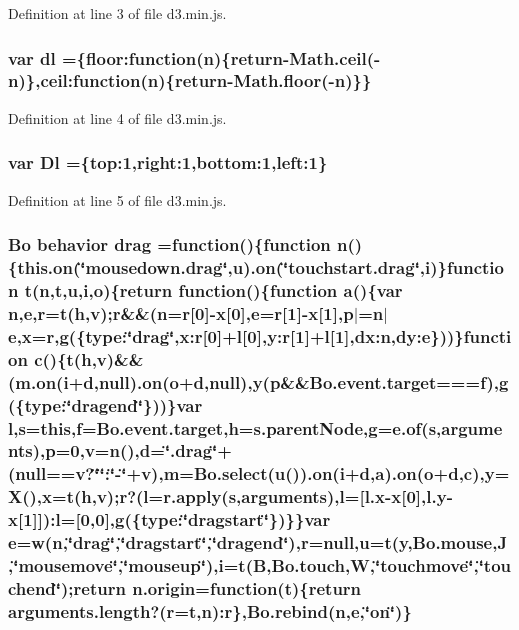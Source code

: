 Definition at line 3 of file d3.\+min.\+js.

\subsubsection[{dl}]{\setlength{\rightskip}{0pt plus 5cm}var dl =\{floor\+:function({\bf n})\{{\bf return}-\/Math.\+ceil(-\/{\bf n})\},ceil\+:function({\bf n})\{{\bf return}-\/Math.\+floor(-\/{\bf n})\}\}}\label{d3_8min_8js_a8789cc2be769165de1796cbaa31277bf}


Definition at line 4 of file d3.\+min.\+js.

\subsubsection[{Dl}]{\setlength{\rightskip}{0pt plus 5cm}var Dl =\{top\+:1,right\+:1,bottom\+:1,left\+:1\}}\label{d3_8min_8js_aed2ea4ac99f601276130fff5ecff77eb}


Definition at line 5 of file d3.\+min.\+js.

\subsubsection[{drag}]{ {\bf Bo} {\bf behavior} drag =function()\{function {\bf n}()\{{\bf this.\+on}(\char`\"{}mousedown.\+drag\char`\"{},u).{\bf on}(\char`\"{}touchstart.\+drag\char`\"{},i)\}function t({\bf n},t,u,{\bf i},{\bf o})\{{\bf return} function()\{function {\bf a}()\{var {\bf n},{\bf e},{\bf r}=t(h,v);{\bf r}\&\&({\bf n}={\bf r}[0]-\/{\bf x}[0],{\bf e}={\bf r}[1]-\/{\bf x}[1],p$\vert$={\bf n}$\vert${\bf e},{\bf x}={\bf r},g(\{type\+:\char`\"{}drag\char`\"{},x\+:r[0]+l[0],y\+:r[1]+l[1],dx\+:n,dy\+:e\}))\}function {\bf c}()\{t(h,v)\&\&({\bf m.\+on}({\bf i}+{\bf d},null).{\bf on}({\bf o}+{\bf d},null),y(p\&\&Bo.\+event.\+target==={\bf f}),g(\{type\+:\char`\"{}dragend\char`\"{}\}))\}var l,s={\bf this},{\bf f}=Bo.\+event.\+target,h=s.\+parent\+Node,g=e.\+of(s,arguments),p=0,v={\bf n}(),{\bf d}=\char`\"{}.drag\char`\"{}+(null==v?\char`\"{}\char`\"{}\+:\char`\"{}-\/\char`\"{}+v),m={\bf Bo.\+select}(u()).{\bf on}({\bf i}+{\bf d},{\bf a}).{\bf on}({\bf o}+{\bf d},{\bf c}),y=X(),{\bf x}=t(h,v);{\bf r}?(l=r.\+apply(s,arguments),l=[{\bf l.\+x}-\/{\bf x}[0],l.\+y-\/{\bf x}[1]])\+:l=[0,0],g(\{type\+:\char`\"{}dragstart\char`\"{}\})\}\}var {\bf e}=w({\bf n},\char`\"{}drag\char`\"{},\char`\"{}dragstart\char`\"{},\char`\"{}dragend\char`\"{}),r=null,u=t(y,{\bf Bo.\+mouse},J,\char`\"{}mousemove\char`\"{},\char`\"{}mouseup\char`\"{}),i=t(B,{\bf Bo.\+touch},W,\char`\"{}touchmove\char`\"{},\char`\"{}touchend\char`\"{});return n.\+origin=function(t)\{{\bf return} arguments.\+length?({\bf r}=t,{\bf n})\+:{\bf r}\},{\bf Bo.\+rebind}({\bf n},{\bf e},\char`\"{}on\char`\"{})\}}\label{d3_8min_8js_a739a23d8b197a293675d7d80fc38421e}


